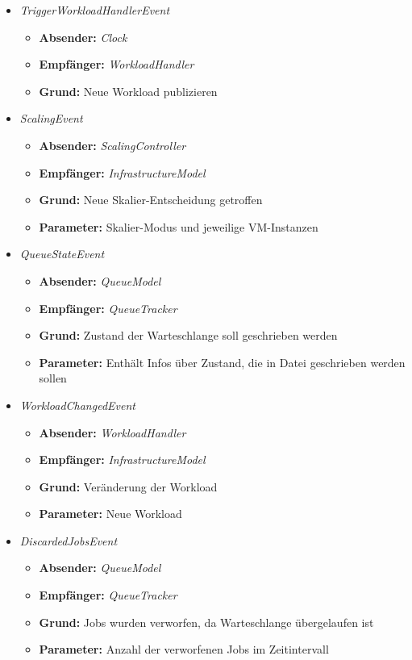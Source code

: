 \begin{itemize}
	\item \textit{TriggerWorkloadHandlerEvent} 
\begin{itemize}
	\item \textbf{Absender:} \textit{Clock}
	\item \textbf{Empfänger:} \textit{WorkloadHandler}
	\item \textbf{Grund:} Neue Workload publizieren
\end{itemize} 

	\item \textit{ScalingEvent} 
\begin{itemize}
	\item \textbf{Absender:} \textit{ScalingController}
	\item \textbf{Empfänger:} \textit{InfrastructureModel}
	\item \textbf{Grund:} Neue Skalier-Entscheidung getroffen
	\item \textbf{Parameter:} Skalier-Modus und jeweilige VM-Instanzen
\end{itemize} 

	\item \textit{QueueStateEvent} 
\begin{itemize}
	\item \textbf{Absender:} \textit{QueueModel}
	\item \textbf{Empfänger:} \textit{QueueTracker}
	\item \textbf{Grund:} Zustand der Warteschlange soll geschrieben werden
	\item \textbf{Parameter:} Enthält Infos über Zustand, die in Datei geschrieben werden sollen
\end{itemize} 



	\item \textit{WorkloadChangedEvent} 
\begin{itemize}
	\item \textbf{Absender:} \textit{WorkloadHandler}
	\item \textbf{Empfänger:} \textit{InfrastructureModel}
	\item \textbf{Grund:} Veränderung der Workload
	\item \textbf{Parameter:} Neue Workload
\end{itemize} 



\pagebreak




	\item \textit{DiscardedJobsEvent} 
\begin{itemize}
	\item \textbf{Absender:} \textit{QueueModel}
	\item \textbf{Empfänger:} \textit{QueueTracker}
	\item \textbf{Grund:} Jobs wurden verworfen, da Warteschlange übergelaufen ist
	\item \textbf{Parameter:} Anzahl der verworfenen Jobs im Zeitintervall
\end{itemize} 


\end{itemize}

